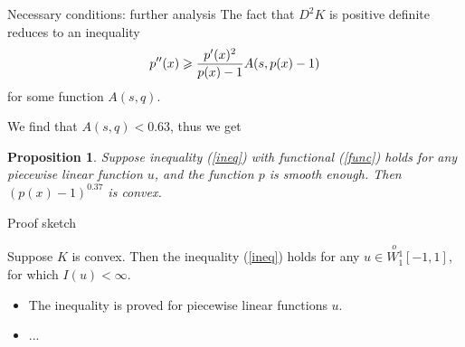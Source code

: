 \documentclass{beamer}\usepackage[]{graphicx}\usepackage[]{color}
\renewcommand{\ge}{\geqslant}
\newcommand{\Wf}{\stackrel{o\ }{W{}_1^1}}
\newtheorem{prop}{Proposition}
\begin{document}
\begin{frame}{Necessary conditions: further analysis}
The fact that $D^2 K$ is positive definite reduces to an inequality
$$p''(x) \ge {p'(x)^2 \over p(x) - 1} A(s, p(x) - 1)$$
for some function $A(s, q)$.

We find that $A(s, q) < 0.63$, thus we get
\begin{prop}
Suppose inequality (\ref{ineq}) with functional (\ref{func}) holds for any piecewise linear function $u$,
and the function $p$ is smooth enough.
Then $(p(x) - 1)^{0.37}$ is convex.
\end{prop}

\end{frame}

\begin{frame}{Proof sketch}

\begin{theorem}
Suppose $K$ is convex.
Then the inequality (\ref{ineq}) holds for any $u \in \Wf[-1, 1]$, for which $I(u) < \infty$.
\end{theorem}

\begin{itemize}
\item The inequality is proved for piecewise linear functions $u$.

\item ...
\end{itemize}

\end{frame}
\end{document}
